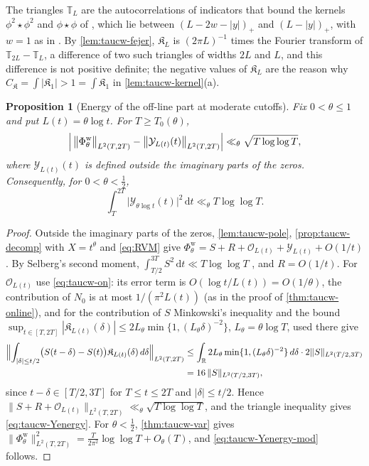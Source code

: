 \documentclass[11pt,a4paper]{article}
\numberwithin{equation}{section}
\newtheorem{proposition}[theorem]{Proposition}
\theoremstyle{definition}
\theoremstyle{remark}
\newcommand{\dd}{\,\mathrm dt}
\begin{document}
The triangles $\mathbb T_L$ are the autocorrelations of indicators that bound the kernels $\phi^2\star\phi^2$ and $\phi\star\phi$ of \cite[\S5.1, (5.1)--(5.2)]{AlpogeFurman2026}, which lie between $(L-2w-|y|)_+$ and $(L-|y|)_+$, with $w=1$ as in \cite[\S5.1]{AlpogeFurman2026}. By \cref{lem:taucw-fejer}, $\mathfrak K_L$ is $(2\pi L)^{-1}$ times the Fourier transform of $\mathbb T_{2L}-\mathbb T_L$, a difference of two such triangles of widths $2L$ and $L$, and this difference is not positive definite; the negative values of $\mathfrak K_L$ are the reason why $C_{\mathfrak K}=\int|\mathfrak K_1|>1=\int\mathfrak K_1$ in \cref{lem:taucw-kernel}(a).

\begin{proposition}[Energy of the off-line part at moderate cutoffs]\label{prop:taucw-Yenergy}
Fix $0<\theta\le1$ and put $L(t)=\theta\log t$. For $T\ge T_0(\theta)$,
\begin{equation}\label{eq:taucw-Yenergy}
\Bigl|\,\bigl\|\Phi^{\mathrm w}_\theta\bigr\|_{L^2(T,2T)}-\bigl\|\mathcal Y_{L(t)}(t)\bigr\|_{L^2(T,2T)}\Bigr|\ll_\theta\sqrt{T\log\log T},
\end{equation}
where $\mathcal Y_{L(t)}(t)$ is defined outside the imaginary parts of the zeros. Consequently, for $0<\theta<\frac12$,
\begin{equation}\label{eq:taucw-Yenergy-mod}
\int_T^{2T}\bigl|\mathcal Y_{\theta\log t}(t)\bigr|^2\dd\ll_\theta T\log\log T .
\end{equation}
\end{proposition}
\begin{proof}
Outside the imaginary parts of the zeros, \cref{lem:taucw-pole}, \cref{prop:taucw-decomp} with $X=t^\theta$ and \eqref{eq:RVM} give $\Phi^{\mathrm w}_\theta=S+R+\mathcal O_{L(t)}+\mathcal Y_{L(t)}+O(1/t)$. By Selberg's second moment, $\int_{T/2}^{3T}S^2\dd\ll T\log\log T$ \cite{Selberg1946,Titchmarsh}, and $R=O(1/t)$. For $\mathcal O_{L(t)}$ use \eqref{eq:taucw-on}: its error term is $O(\log t/L(t))=O(1/\theta)$, the contribution of $N_0$ is at most $1/(\pi^2L(t))$ (as in the proof of \cref{thm:taucw-online}), and for the contribution of $S$ Minkowski's inequality and the bound $\sup_{t\in[T,2T]}|\mathfrak K_{L(t)}(\delta)|\le2L_\theta\min\{1,(L_\theta\delta)^{-2}\}$, $L_\theta=\theta\log T$, used there give
\begin{equation}
\begin{aligned}
\Bigl\|\int_{|\delta|\le t/2}\bigl(S(t-\delta)-S(t)\bigr)\mathfrak K_{L(t)}(\delta)\,d\delta\Bigr\|_{L^2(T,2T)}&\le\int_{\mathbb R}2L_\theta\min\{1,(L_\theta\delta)^{-2}\}\,d\delta\cdot2\|S\|_{L^2(T/2,3T)}\\
&=16\,\|S\|_{L^2(T/2,3T)} ,
\end{aligned}
\end{equation}
since $t-\delta\in[T/2,3T]$ for $T\le t\le2T$ and $|\delta|\le t/2$. Hence $\|S+R+\mathcal O_{L(t)}\|_{L^2(T,2T)}\ll_\theta\sqrt{T\log\log T}$, and the triangle inequality gives \eqref{eq:taucw-Yenergy}. For $\theta<\frac12$, \cref{thm:taucw-var} gives $\|\Phi^{\mathrm w}_\theta\|_{L^2(T,2T)}^2=\frac T{2\pi^2}\log\log T+O_\theta(T)$, and \eqref{eq:taucw-Yenergy-mod} follows.
\end{proof}
\end{document}
